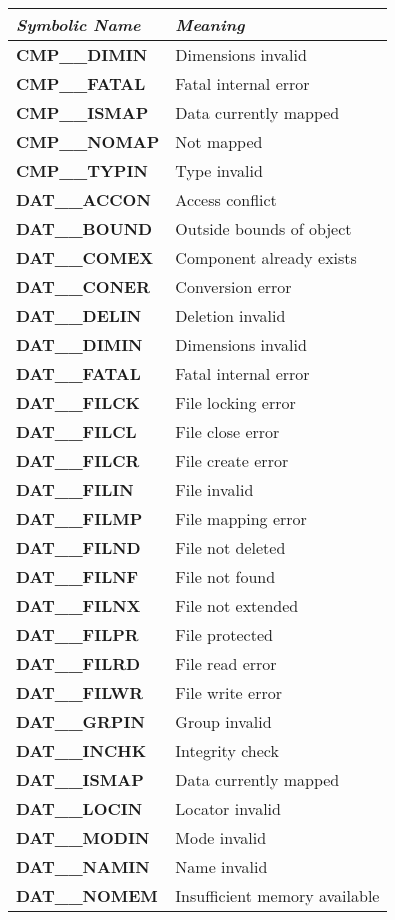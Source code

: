 \small
\begin{center}
\begin{tabular}{|l|l|} \hline
{\em Symbolic Name} & {\em Meaning}\\ \hline \hline
{\bf CMP\_\_DIMIN} & Dimensions invalid\\
{\bf CMP\_\_FATAL} & Fatal internal error\\
{\bf CMP\_\_ISMAP} & Data currently mapped\\
{\bf CMP\_\_NOMAP} & Not mapped\\
{\bf CMP\_\_TYPIN} & Type invalid\\[2ex]
{\bf DAT\_\_ACCON} & Access conflict\\
{\bf DAT\_\_BOUND} & Outside bounds of object\\
{\bf DAT\_\_COMEX} & Component already exists\\
{\bf DAT\_\_CONER} & Conversion error\\
{\bf DAT\_\_DELIN} & Deletion invalid\\
{\bf DAT\_\_DIMIN} & Dimensions invalid\\
{\bf DAT\_\_FATAL} & Fatal internal error\\
{\bf DAT\_\_FILCK} & File locking error\\
{\bf DAT\_\_FILCL} & File close error\\
{\bf DAT\_\_FILCR} & File create error\\
{\bf DAT\_\_FILIN} & File invalid\\
{\bf DAT\_\_FILMP} & File mapping error\\
{\bf DAT\_\_FILND} & File not deleted\\
{\bf DAT\_\_FILNF} & File not found\\
{\bf DAT\_\_FILNX} & File not extended\\
{\bf DAT\_\_FILPR} & File protected\\
{\bf DAT\_\_FILRD} & File read error\\
{\bf DAT\_\_FILWR} & File write error\\
{\bf DAT\_\_GRPIN} & Group invalid\\
{\bf DAT\_\_INCHK} & Integrity check\\
{\bf DAT\_\_ISMAP} & Data currently mapped\\
{\bf DAT\_\_LOCIN} & Locator invalid\\
{\bf DAT\_\_MODIN} & Mode invalid\\
{\bf DAT\_\_NAMIN} & Name invalid\\
{\bf DAT\_\_NOMEM} & Insufficient memory available\\

\end{tabular}
\end{center}
